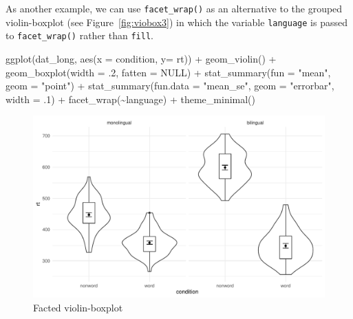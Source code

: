 \documentclass[
  english,
  doc,floatsintext]{apa6}
\newenvironment{Shaded}{\begin{snugshade}}{\end{snugshade}}
\newcommand{\AttributeTok}[1]{\textcolor[rgb]{0.77,0.63,0.00}{#1}}
\newcommand{\ConstantTok}[1]{\textcolor[rgb]{0.00,0.00,0.00}{#1}}
\newcommand{\DecValTok}[1]{\textcolor[rgb]{0.00,0.00,0.81}{#1}}
\newcommand{\FunctionTok}[1]{\textcolor[rgb]{0.00,0.00,0.00}{#1}}
\newcommand{\NormalTok}[1]{#1}
\newcommand{\SpecialCharTok}[1]{\textcolor[rgb]{0.00,0.00,0.00}{#1}}
\newcommand{\StringTok}[1]{\textcolor[rgb]{0.31,0.60,0.02}{#1}}
\begin{document}
As another example, we can use \texttt{facet\_wrap()} as an alternative to the grouped violin-boxplot (see Figure~\ref{fig:viobox3}) in which the variable \texttt{language} is passed to \texttt{facet\_wrap()} rather than \texttt{fill}.

\begin{Shaded}
\begin{Highlighting}[]
\FunctionTok{ggplot}\NormalTok{(dat\_long, }\FunctionTok{aes}\NormalTok{(}\AttributeTok{x =}\NormalTok{ condition, }\AttributeTok{y=}\NormalTok{ rt)) }\SpecialCharTok{+}
  \FunctionTok{geom\_violin}\NormalTok{() }\SpecialCharTok{+}
  \FunctionTok{geom\_boxplot}\NormalTok{(}\AttributeTok{width =}\NormalTok{ .}\DecValTok{2}\NormalTok{, }\AttributeTok{fatten =} \ConstantTok{NULL}\NormalTok{) }\SpecialCharTok{+}
  \FunctionTok{stat\_summary}\NormalTok{(}\AttributeTok{fun =} \StringTok{"mean"}\NormalTok{, }\AttributeTok{geom =} \StringTok{"point"}\NormalTok{) }\SpecialCharTok{+}
  \FunctionTok{stat\_summary}\NormalTok{(}\AttributeTok{fun.data =} \StringTok{"mean\_se"}\NormalTok{, }\AttributeTok{geom =} \StringTok{"errorbar"}\NormalTok{, }\AttributeTok{width =}\NormalTok{ .}\DecValTok{1}\NormalTok{) }\SpecialCharTok{+}
  \FunctionTok{facet\_wrap}\NormalTok{(}\SpecialCharTok{\textasciitilde{}}\NormalTok{language) }\SpecialCharTok{+}
  \FunctionTok{theme\_minimal}\NormalTok{()}
\end{Highlighting}
\end{Shaded}

\begin{figure}

{\centering \includegraphics[width=1\linewidth]{images/violin-boxplot-facet-1} 

}

\caption{Facted violin-boxplot}\label{fig:violin-boxplot-facet}
\end{figure}
\end{document}
